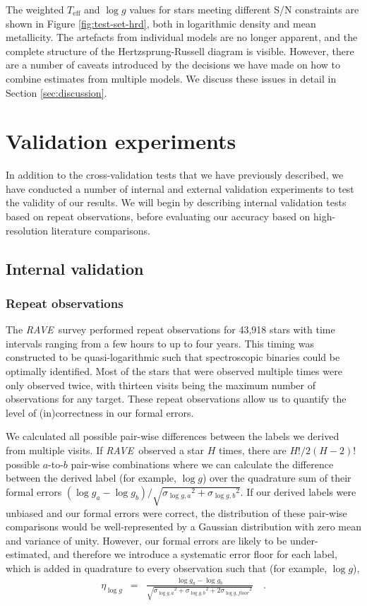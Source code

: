 \documentclass[preprint]{aastex61}
\newcommand{\acronym}[1]{{\small{#1}}}
\newcommand{\project}[1]{\textsl{#1}}
\newcommand{\rave}{\project{\acronym{RAVE}}}
\newcommand{\teff}{T_{\mathrm{eff}}}
\newcommand{\logg}{\log g}
\begin{document}
The weighted $\teff$ and $\logg$ values for stars meeting different S/N 
constraints are shown in Figure \ref{fig:test-set-hrd}, both in logarithmic 
density and mean metallicity.  The artefacts from individual models are no 
longer apparent, and the complete structure of the Hertzsprung-Russell diagram
is visible.  However, there are a number of caveats introduced by the decisions
we have made on how to combine estimates from multiple models. We discuss these 
issues in detail in Section \ref{sec:discussion}.


\section{Validation experiments}
\label{sec:validation}


In addition to the cross-validation tests that we have previously described, 
we have conducted a number of internal and external validation experiments to 
test the validity of our results.  We will begin by describing internal validation
tests based on repeat observations, before evaluating our accuracy based on
high-resolution literature comparisons.


\subsection{Internal validation}
\subsubsection{Repeat observations}
\label{sec:repeat-observations}

The \rave\ survey performed repeat observations for 43,918 stars with time 
intervals ranging from a few hours to up to four years.  This timing was 
constructed to be quasi-logarithmic such that spectroscopic binaries could
be optimally identified. Most of the stars that were observed multiple times
were only observed twice, with thirteen visits being the maximum number 
of observations for any target.  These repeat observations allow us to 
quantify the level of (in)correctness in our formal errors.  


We calculated all possible pair-wise differences between the labels we
derived from multiple visits.  If \rave\ observed a star $H$ times, there 
are $H!/2(H-2)!$ possible $a$-to-$b$ pair-wise combinations where we can calculate 
the difference between the derived label (for example, $\logg$) over the
quadrature sum of their formal errors $(\logg_a - \logg_b)/\sqrt{{\sigma_{\logg,a}}^2 + {\sigma_{\logg,b}}^2}$.  If our derived labels were unbiased and our formal
errors were correct, the distribution of these pair-wise comparisons would be
well-represented by a Gaussian distribution with zero mean and variance
of unity.  However, our formal errors are likely to be under-estimated,
and therefore we introduce a systematic error floor for each label, which
is added in quadrature to every observation such that (for example, $\logg$),
\begin{eqnarray}
	\eta_{\logg} & = & \frac{\logg_a - \logg_b}{\sqrt{{\sigma_{\logg,a}}^2 + {\sigma_{\logg,b}}^2 + 2{\sigma_{\logg,floor}}^2}} \quad .
\end{eqnarray}
\end{document}

